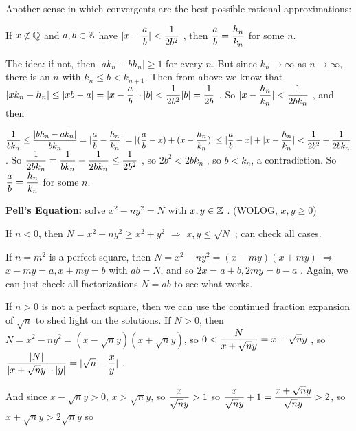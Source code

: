 \ssk

Another sense in which convergents are the best 
possible rational approximations:

\ssk

If $x\not\in {\Bbb Q}$ and $a,b\in {\Bbb Z}$ have $\displaystyle |x-{{a}\over{b}}| < {{1}\over{2b^2}}$ , then 
$\displaystyle {{a}\over{b}} = {{h_n}\over{k_n}}$ for some $n$. 

\ssk

The idea: if not, then $|ak_n-bh_n|\geq 1$ for every $n$. But since $k_n\rightarrow \infty$ as
$n\rightarrow \infty$, there is an $n$ with $k_n\leq b< k_{n+1}$. Then from above we 
know that $\displaystyle |xk_n-h_n| \leq |xb-a| = |x-{{a}\over{b}}|\cdot |b| < {{1}\over{2b^2}}|b| = {{1}\over{2b}}$ .
So $\displaystyle |x-{{h_n}\over{k_n}}| < {{1}\over{2bk_n}}$ , and then 

$\displaystyle {{1}\over{bk_n}}\leq {{|bh_n-ak_n|}\over{bk_n}} = |{{a}\over{b}} - {{h_n}\over{k_n}}|
 = |({{a}\over{b}}-x) + (x - {{h_n}\over{k_n}})| \leq  |{{a}\over{b}}-x| + |x - {{h_n}\over{k_n}}|
< {{1}\over{2b^2}} + {{1}\over{2bk_n}}$ . So 
$\displaystyle {{1}\over{2bk_n}} = {{1}\over{bk_n}} - {{1}\over{2bk_n}} \leq {{1}\over{2b^2}}$ , so 
$2b^2 < 2bk_n$ , so $b<k_n$, a contradiction. So $\displaystyle {{a}\over{b}} = {{h_n}\over{k_n}}$ for some $n$.


\ssk


{\bf Pell's Equation:} solve $x^2-ny^2=N$ with $x,y\in {\Bbb Z}$ . (WOLOG, $x,y\geq 0$)

\ssk

If $n<0$, then $N= x^2-ny^2\geq x^2+y^2$ $\Rightarrow$ $x,y\leq \sqrt{N}$ ; can check all cases.

\ssk

If $n=m^2$ is a perfect square, then $N=x^2-ny^2 = (x-my)(x+my)$ $\Rightarrow$ $x-my=a, x+my=b$
with $ab=N$, and so $2x=a+b, 2my=b-a$ . Again, we can just check all factorizations $N=ab$ to see what works.

\ssk

If $n>0$ is not a perfact square, then we can use the continued fraction expansion of $\sqrt{n}$ to 
shed light on the solutions. If $N>0$, then 
\hhsk
$N=x^2-ny^2 = (x-\sqrt{n}y)(x+\sqrt{n}y)$, so $ \displaystyle 0<{{N}\over{x+\sqrt{n}y}} = x-\sqrt{n}y$ , so
$\displaystyle {{|N|}\over{|x+\sqrt{n}y|\cdot |y|}} = |\sqrt{n} - {{x}\over{y}}|$ .

And since $x-\sqrt{n}y>0$, $x>\sqrt{n}y$, so $\displaystyle {{x}\over{\sqrt{n}y}} >1$ so 
$\displaystyle {{x}\over{\sqrt{n}y}} +1 = {{x+\sqrt{n}y}\over{\sqrt{n}y}} > 2$, so 
$x+\sqrt{n}y > 2\sqrt{n}y$ so 

